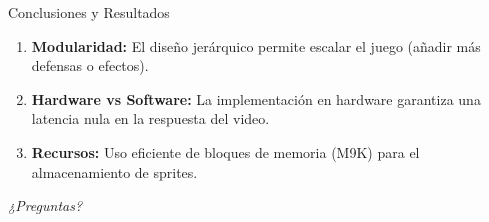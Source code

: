 \documentclass[10pt, spanish]{beamer}
\begin{document}
\begin{frame}{Conclusiones y Resultados}
    \begin{enumerate}
        \item \textbf{Modularidad:} El diseño jerárquico permite escalar el juego (añadir más defensas o efectos).
        \item \textbf{Hardware vs Software:} La implementación en hardware garantiza una latencia nula en la respuesta del video.
        \item \textbf{Recursos:} Uso eficiente de bloques de memoria (M9K) para el almacenamiento de sprites.
    \end{enumerate}
    \vfill
    \begin{center}
        \huge \textit{¿Preguntas?}
    \end{center}
\end{frame}
\end{document}
